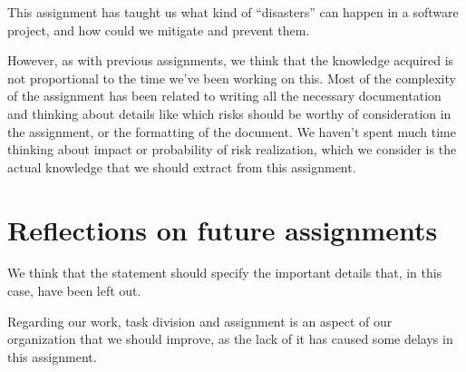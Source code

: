 \documentclass{article}
\begin{document}
This assignment has taught us what kind of ``disasters'' can happen in a software project, and how could we mitigate and prevent them.

However, as with previous assignments, we think that the knowledge acquired is not proportional to the time we've been working on this. Most of the complexity of the assignment has been related to writing all the necessary documentation and thinking about details like which risks should be worthy of consideration in the assignment, or the formatting of the document. We haven't spent much time thinking about impact or probability of risk realization, which we consider is the actual knowledge that we should extract from this assignment.

\section{Reflections on future assignments}

We think that the statement should specify the important details that, in this case, have been left out.

Regarding our work, task division and assignment is an aspect of our organization that we should improve, as the lack of it has caused some delays in this assignment.
\end{document}
